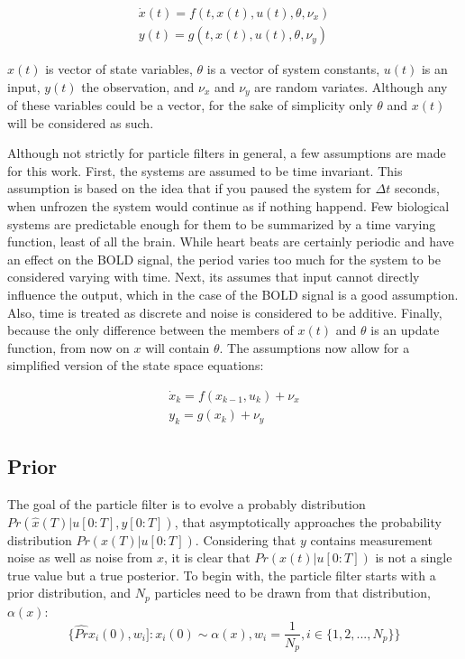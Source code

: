 \begin{eqnarray}
\dot{x}(t) = f(t, x(t), u(t), \theta, \nu_x) \nonumber \\
y(t) = g(t, x(t), u(t), \theta, \nu_y)
\label{eq:GenericNonlinear}
\end{eqnarray}

$x(t)$ is vector of state variables, $\theta$ is a vector of system
constants, $u(t)$ is an input, $y(t)$ the observation, and
$\nu_x$ and $\nu_y$ are random variates. Although any of these
variables could be a vector, for the sake of simplicity only
$\theta$ and $x(t)$ will be considered as such. 

Although not strictly for particle filters in general, a few 
assumptions are made for this work. First, the systems are assumed to be 
time invariant. This 
assumption is based on the idea that if you paused the system for $\Delta t$
seconds, when unfrozen the system would continue as if nothing happend. 
Few biological systems are predictable enough for them to be summarized
by a time varying function, least of all the brain. While heart beats are certainly
periodic and have an effect on the BOLD signal, the period varies too much
for the system to be considered varying with time. 
Next, its assumes that input cannot directly
influence the output, which in the case of the BOLD signal is a good assumption.
Also, time is treated as discrete and noise is considered to be additive.
Finally, because the only difference between the members of $x(t)$ and 
$\theta$ is an update function, from now on $x$ will contain 
$\theta$. The assumptions now allow for a simplified version of the
state space equations:

\begin{eqnarray}
\dot{x}_k = f(x_{k-1}, u_k) + \nu_x 
\label{eq:stateass}\\
y_k = g(x_k) + \nu_y 
\label{eq:measass}
\end{eqnarray}

\subsection{Prior}
The goal of the particle filter is to evolve a probably distribution 
$Pr(\hat{x}(T) | u[0:T], y[0:T])$,
that asymptotically approaches the probability distribution $Pr(x(T) | u[0:T])$.
Considering that $y$ contains measurement noise as well as noise from $x$,
 it is clear that $Pr(x(t) | u[0:T])$ is not a single true value
but a true posterior. 
To begin with, the particle filter starts with a prior distribution, and $N_p$
particles need to be drawn from that distribution, $\alpha(x)$:
\begin{equation}
\{\hat{Pr}x_i(0),w_i] : x_i(0) \sim \alpha(x), w_i = \frac{1}{N_p}, i \in \{1, 2, ... , N_p\} \}
\end{equation}

